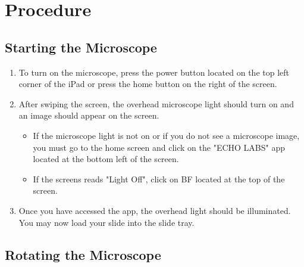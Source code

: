 \documentclass{article}
\begin{document}
\section{Procedure}

\subsection{Starting the Microscope}

\begin{enumerate}
  \item To turn on the microscope, press the power button located on the top left corner of the iPad or press the home button on the right of the screen.
  \item After swiping the screen, the overhead microscope light should turn on and an image should appear on the screen.
  
\begin{itemize}
  \item If the microscope light is not on or if you do not see a microscope image, you must go to the home screen and click on the "ECHO LABS" app located at the bottom left of the screen.
  \item If the screens reads "Light Off", click on BF located at the top of the screen.
\end{itemize}

  \item Once you have accessed the app, the overhead light should be illuminated. You may now load your slide into the slide tray.
\end{enumerate} 
  
  
\subsection{Rotating the Microscope}
\end{document}
